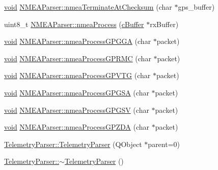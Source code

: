 \begin{DoxyCompactItemize}
\item 
\hyperlink{group___u_a_v_objects_plugin_ga444cf2ff3f0ecbe028adce838d373f5c}{void} \hyperlink{group___g_p_s_gadget_plugin_gab0b239f615ef146897cec5c020735a8e}{\-N\-M\-E\-A\-Parser\-::nmea\-Terminate\-At\-Checksum} (char $\ast$gps\-\_\-buffer)
\item 
uint8\-\_\-t \hyperlink{group___g_p_s_gadget_plugin_ga55718bf48b8a95492b1aa43a65490e64}{\-N\-M\-E\-A\-Parser\-::nmea\-Process} (\hyperlink{group__buffer_ga63b2a19263ed371e329776b34f3164eb}{c\-Buffer} $\ast$rx\-Buffer)
\item 
\hyperlink{group___u_a_v_objects_plugin_ga444cf2ff3f0ecbe028adce838d373f5c}{void} \hyperlink{group___g_p_s_gadget_plugin_ga0ac80dbcc0ad8bec03f026c3feb2c097}{\-N\-M\-E\-A\-Parser\-::nmea\-Process\-G\-P\-G\-G\-A} (char $\ast$packet)
\item 
\hyperlink{group___u_a_v_objects_plugin_ga444cf2ff3f0ecbe028adce838d373f5c}{void} \hyperlink{group___g_p_s_gadget_plugin_ga838f8b6c0bea66c17f82fec788a1a74f}{\-N\-M\-E\-A\-Parser\-::nmea\-Process\-G\-P\-R\-M\-C} (char $\ast$packet)
\item 
\hyperlink{group___u_a_v_objects_plugin_ga444cf2ff3f0ecbe028adce838d373f5c}{void} \hyperlink{group___g_p_s_gadget_plugin_ga10893234aff922433723153e6057386e}{\-N\-M\-E\-A\-Parser\-::nmea\-Process\-G\-P\-V\-T\-G} (char $\ast$packet)
\item 
\hyperlink{group___u_a_v_objects_plugin_ga444cf2ff3f0ecbe028adce838d373f5c}{void} \hyperlink{group___g_p_s_gadget_plugin_gad10ce6b495849dd4cf6e019d650a87f7}{\-N\-M\-E\-A\-Parser\-::nmea\-Process\-G\-P\-G\-S\-A} (char $\ast$packet)
\item 
\hyperlink{group___u_a_v_objects_plugin_ga444cf2ff3f0ecbe028adce838d373f5c}{void} \hyperlink{group___g_p_s_gadget_plugin_ga35b60b2a2f0643fd5202557a5aaace81}{\-N\-M\-E\-A\-Parser\-::nmea\-Process\-G\-P\-G\-S\-V} (char $\ast$packet)
\item 
\hyperlink{group___u_a_v_objects_plugin_ga444cf2ff3f0ecbe028adce838d373f5c}{void} \hyperlink{group___g_p_s_gadget_plugin_ga01e0952dc227b7f7d3cef2d36f684544}{\-N\-M\-E\-A\-Parser\-::nmea\-Process\-G\-P\-Z\-D\-A} (char $\ast$packet)
\item 
\hyperlink{group___g_p_s_gadget_plugin_ga0a989a67079a7e06f5034415c751b46c}{\-Telemetry\-Parser\-::\-Telemetry\-Parser} (\-Q\-Object $\ast$parent=0)
\item 
\hyperlink{group___g_p_s_gadget_plugin_ga9a05a4fb6f18cdc568bc4e8f52534977}{\-Telemetry\-Parser\-::$\sim$\-Telemetry\-Parser} ()
\end{DoxyCompactItemize}
